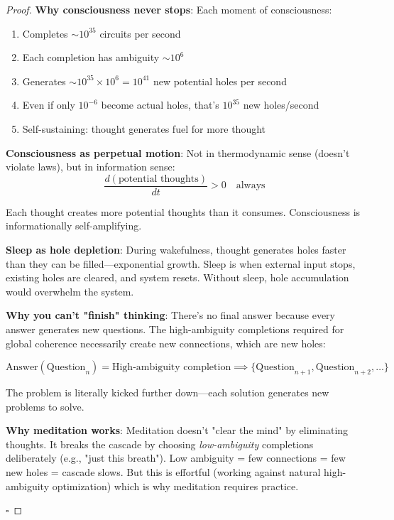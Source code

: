 \documentclass[11pt,a4paper]{article}
\begin{document}
\begin{proof}
\textbf{Why consciousness never stops}: Each moment of consciousness:
\begin{enumerate}
\item Completes $\sim 10^{35}$ circuits per second
\item Each completion has ambiguity $\sim 10^6$
\item Generates $\sim 10^{35} \times 10^6 = 10^{41}$ new potential holes per second
\item Even if only $10^{-6}$ become actual holes, that's $10^{35}$ new holes/second
\item Self-sustaining: thought generates fuel for more thought
\end{enumerate}

\textbf{Consciousness as perpetual motion}: Not in thermodynamic sense (doesn't violate laws), but in information sense:
\begin{equation}
\frac{d(\text{potential thoughts})}{dt} > 0 \quad \text{always}
\end{equation}

Each thought creates more potential thoughts than it consumes. Consciousness is informationally self-amplifying.

\textbf{Sleep as hole depletion}: During wakefulness, thought generates holes faster than they can be filled—exponential growth. Sleep is when external input stops, existing holes are cleared, and system resets. Without sleep, hole accumulation would overwhelm the system.

\textbf{Why you can't "finish" thinking}: There's no final answer because every answer generates new questions. The high-ambiguity completions required for global coherence necessarily create new connections, which are new holes:

\begin{equation}
\text{Answer}(\text{Question}_n) = \text{High-ambiguity completion} \implies \{\text{Question}_{n+1}, \text{Question}_{n+2}, \ldots\}
\end{equation}

The problem is literally kicked further down—each solution generates new problems to solve.

\textbf{Why meditation works}: Meditation doesn't "clear the mind" by eliminating thoughts. It breaks the cascade by choosing \textit{low-ambiguity} completions deliberately (e.g., "just this breath"). Low ambiguity = few connections = few new holes = cascade slows. But this is effortful (working against natural high-ambiguity optimization) which is why meditation requires practice.

$\square$
\end{proof}
\end{document}
